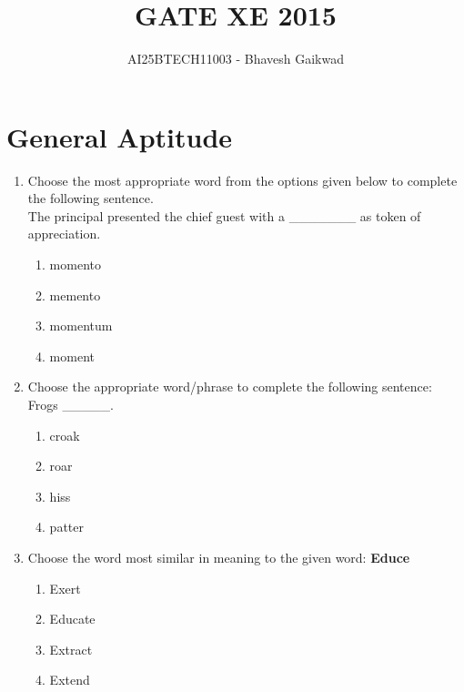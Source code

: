 \documentclass[journal,12pt,onecolumn]{IEEEtran}
\begin{document}
\title{GATE XE 2015}
\author{AI25BTECH11003 - Bhavesh Gaikwad}
\maketitle

\section*{General Aptitude}
\vspace{1cm}
\begin{enumerate}[label=\arabic*)]

\item Choose the most appropriate word from the options given below to complete the following sentence.\\
The principal presented the chief guest with a \_\_\_\_\_\_\_ as token of appreciation.  
\hfill{} \\
\vspace{0.2cm}
\begin{enumerate}[label=\alph*)]
\item momento
\item memento
\item momentum
\item moment
\end{enumerate}

\vspace{0.5cm}

\item Choose the appropriate word/phrase to complete the following sentence: 
Frogs \_\_\_\_\_.  
\hfill{} \\

\vspace{0.2cm}
\begin{enumerate}[label=\alph*)]
\item croak
\item roar
\item hiss
\item patter
\end{enumerate}

\vspace{0.5cm}

\item Choose the word most similar in meaning to the given word: \textbf{Educe}  
\hfill{} \\
\vspace{0.2cm}
\begin{enumerate}[label=\alph*)]
\item Exert
\item Educate
\item Extract
\item Extend
\end{enumerate}


\end{enumerate}
\end{document}
